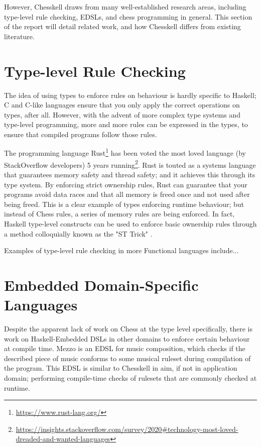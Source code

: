 \documentclass[12pt, a4paper, bibliography=totocnumbered]{scrreprt}
\begin{document}
However, Chesskell draws from many well-established research areas, including type-level rule checking, EDSLs, and chess programming in general. This section of the report will detail related work, and how Chesskell differs from existing literature.

\section{Type-level Rule Checking}

The idea of using types to enforce rules on behaviour is hardly specific to Haskell; C and C-like languages ensure that you only apply the correct operations on types, after all. However, with the advent of more complex type systems and type-level programming, more and more rules can be expressed in the types, to ensure that compiled programs follow those rules.

The programming language Rust\footnote{\url{https://www.rust-lang.org/}} has been voted the most loved language (by StackOverflow developers) 5 years running\footnote{\url{https://insights.stackoverflow.com/survey/2020\#technology-most-loved-dreaded-and-wanted-languages}}. Rust is touted as a systems language that guarantees memory safety and thread safety; and it achieves this through its type system. By enforcing strict ownership rules, Rust can guarantee that your programs avoid data races and that all memory is freed once and not used after being freed. This is a clear example of types enforcing runtime behaviour; but instead of Chess rules, a series of memory rules are being enforced. In fact, Haskell type-level constructs can be used to enforce basic ownership rules through a method colloquially known as the "ST Trick" \cite{twt}.

Examples of type-level rule checking in more Functional languages include... %

\section{Embedded Domain-Specific Languages}

Despite the apparent lack of work on Chess at the type level specifically, there is work on Haskell-Embedded DSLs in other domains to enforce certain behaviour at compile time. Mezzo \cite{mezzohaskellsymposium} is an EDSL for music composition, which checks if the described piece of music conforms to some musical ruleset during compilation of the program. This EDSL is similar to Chesskell in aim, if not in application domain; performing compile-time checks of rulesets that are commonly checked at runtime.
\end{document}
